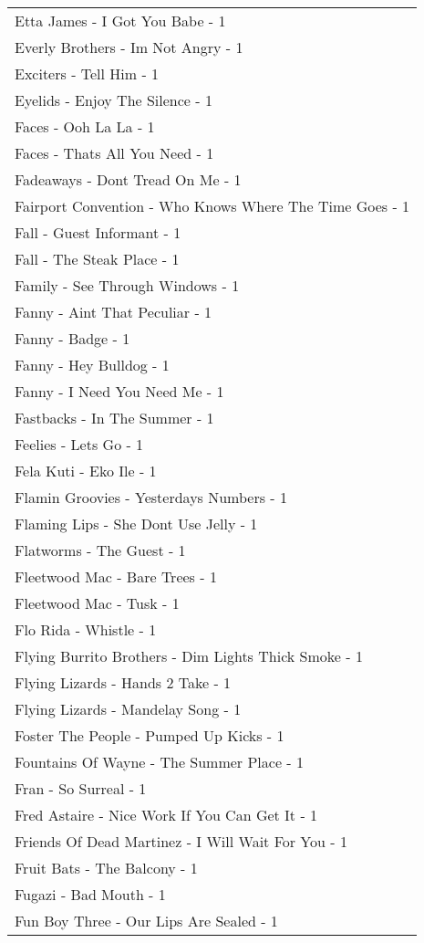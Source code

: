 \documentclass[
]{article}
\begin{document}
\begin{longtable}{l}
Etta James - I Got You Babe - 1 \\ 
Everly Brothers - Im Not Angry - 1 \\ 
Exciters - Tell Him - 1 \\ 
Eyelids - Enjoy The Silence - 1 \\ 
Faces - Ooh La La - 1 \\ 
Faces - Thats All You Need - 1 \\ 
Fadeaways - Dont Tread On Me - 1 \\ 
Fairport Convention - Who Knows Where The Time Goes - 1 \\ 
Fall - Guest Informant - 1 \\ 
Fall - The Steak Place - 1 \\ 
Family - See Through Windows - 1 \\ 
Fanny - Aint That Peculiar - 1 \\ 
Fanny - Badge - 1 \\ 
Fanny - Hey Bulldog - 1 \\ 
Fanny - I Need You Need Me - 1 \\ 
Fastbacks - In The Summer - 1 \\ 
Feelies - Lets Go - 1 \\ 
Fela Kuti - Eko Ile - 1 \\ 
Flamin Groovies - Yesterdays Numbers - 1 \\ 
Flaming Lips - She Dont Use Jelly - 1 \\ 
Flatworms - The Guest - 1 \\ 
Fleetwood Mac - Bare Trees - 1 \\ 
Fleetwood Mac - Tusk - 1 \\ 
Flo Rida - Whistle - 1 \\ 
Flying Burrito Brothers - Dim Lights Thick Smoke - 1 \\ 
Flying Lizards - Hands 2 Take - 1 \\ 
Flying Lizards - Mandelay Song - 1 \\ 
Foster The People - Pumped Up Kicks - 1 \\ 
Fountains Of Wayne - The Summer Place - 1 \\ 
Fran - So Surreal - 1 \\ 
Fred Astaire - Nice Work If You Can Get It - 1 \\ 
Friends Of Dead Martinez - I Will Wait For You - 1 \\ 
Fruit Bats - The Balcony - 1 \\ 
Fugazi - Bad Mouth - 1 \\ 
Fun Boy Three - Our Lips Are Sealed - 1 \\ 

\end{longtable}
\end{document}

